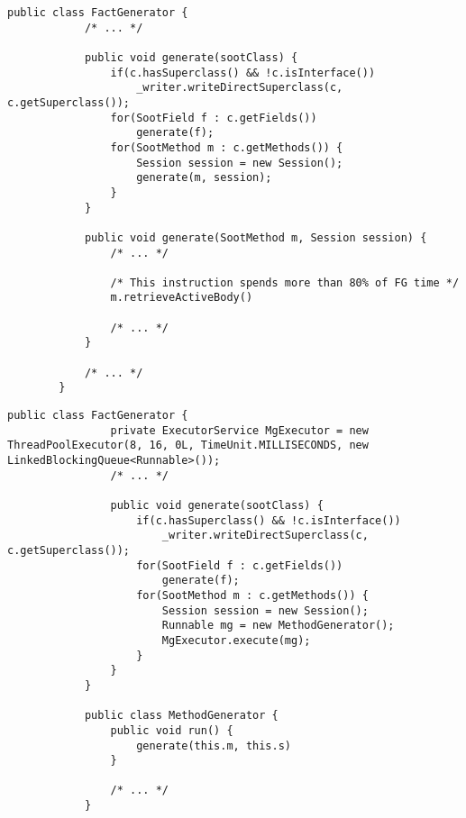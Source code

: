 \documentclass{dithesis}
\begin{document}
    \begin{lstlisting}[frame=single] 
        public class FactGenerator {
            /* ... */

            public void generate(sootClass) {
                if(c.hasSuperclass() && !c.isInterface())
                    _writer.writeDirectSuperclass(c, c.getSuperclass());
                for(SootField f : c.getFields())
                    generate(f);
                for(SootMethod m : c.getMethods()) {
                    Session session = new Session();
                    generate(m, session);
                }
            }

            public void generate(SootMethod m, Session session) {
                /* ... */
                
                /* This instruction spends more than 80% of FG time */
                m.retrieveActiveBody() 
                
                /* ... */
            }

            /* ... */
        }
    \end{lstlisting}

        \begin{lstlisting}[frame=single]
            public class FactGenerator {
                private ExecutorService MgExecutor = new ThreadPoolExecutor(8, 16, 0L, TimeUnit.MILLISECONDS, new LinkedBlockingQueue<Runnable>());
                /* ... */

                public void generate(sootClass) {
                    if(c.hasSuperclass() && !c.isInterface())
                        _writer.writeDirectSuperclass(c, c.getSuperclass());
                    for(SootField f : c.getFields())
                        generate(f);
                    for(SootMethod m : c.getMethods()) {
                        Session session = new Session();
                        Runnable mg = new MethodGenerator();
                        MgExecutor.execute(mg);
                    }
                }
            }

            public class MethodGenerator {
                public void run() {
                    generate(this.m, this.s)
                }

                /* ... */
            }
        \end{lstlisting}
\end{document}
